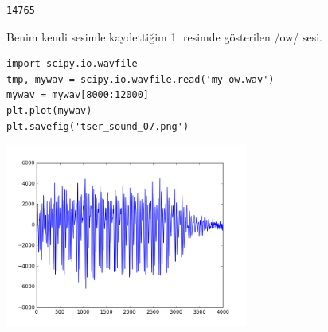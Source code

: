 \documentclass[12pt,fleqn]{article}\usepackage{../../common}
\begin{document}
\begin{verbatim}
14765
\end{verbatim}

Benim kendi sesimle kaydettiğim 1. resimde gösterilen /ow/ sesi.

\begin{verbatim}
import scipy.io.wavfile
tmp, mywav = scipy.io.wavfile.read('my-ow.wav')
mywav = mywav[8000:12000]
plt.plot(mywav)
plt.savefig('tser_sound_07.png')
\end{verbatim}

\includegraphics[height=6cm]{tser_sound_07.png}
\end{document}

